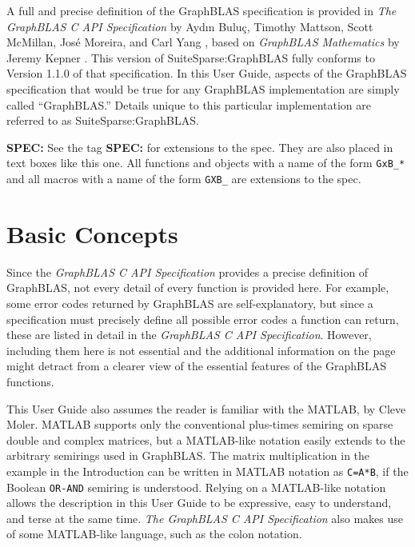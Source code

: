 \documentclass[12pt]{article}
\begin{document}
A full and precise definition of the GraphBLAS specification is provided in
{\em The GraphBLAS C API Specification} by {Ayd\i n Bulu\c{c}, Timothy Mattson,
Scott McMillan, Jos\'e Moreira, and Carl Yang} \cite{spec}, based on {\em
GraphBLAS Mathematics} by Jeremy Kepner \cite{Kepner2017}.
This version of SuiteSparse:GraphBLAS fully conforms to Version 1.1.0 of that
specification.  In this User Guide, aspects of the GraphBLAS specification that
would be true for any GraphBLAS implementation are simply called ``GraphBLAS.''
Details unique to this particular implementation are referred to as
SuiteSparse:GraphBLAS. 

\begin{spec}
{\bf SPEC:} See the tag {\bf SPEC:} for extensions to the spec.  They are also placed in text boxes like this one.
All functions and objects with a name of the form \verb'GxB_*'
and all macros with a name of the form \verb'GXB_'
are extensions to the spec.
\end{spec}

\section{Basic Concepts} %
\label{basic}

Since the {\em GraphBLAS C API Specification} provides a precise definition of
GraphBLAS, not every detail of every function is provided here.  For example,
some error codes returned by GraphBLAS are self-explanatory, but since a
specification must precisely define all possible error codes a function can
return, these are listed in detail in the {\em GraphBLAS C API Specification}.
However, including them here is not essential and the additional information on
the page might detract from a clearer view of the essential features of the
GraphBLAS functions.

This User Guide also assumes the reader is familiar with the MATLAB, by Cleve
Moler.  MATLAB supports only the conventional plus-times semiring on sparse
double and complex matrices, but a MATLAB-like notation easily extends to the
arbitrary semirings used in GraphBLAS.  The matrix multiplication in the
example in the Introduction can be written in MATLAB notation as \verb'C=A*B',
if the Boolean \verb'OR-AND' semiring is understood.  Relying on a MATLAB-like
notation allows the description in this User Guide to be expressive, easy to
understand, and terse at the same time.  {\em The GraphBLAS C API
Specification} also makes use of some MATLAB-like language, such as the colon
notation.
\end{document}
